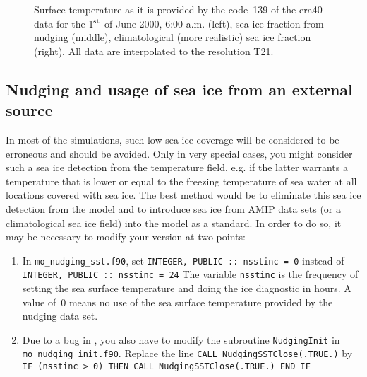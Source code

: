 \begin{appendix}
\begin{figure}[h]
         {\hspace{-3cm}}
         {\hspace{-3cm}}
\caption{Surface temperature as it is provided by the code~139 of the
  era40 data for the 1$^{\rm st}$ of June 2000, 6:00 a.m. (left), sea
  ice fraction from nudging (middle), climatological (more realistic)
  sea ice fraction (right). All data are interpolated to the
  resolution T21.}\label{figice} 
\end{figure}

\subsection{Nudging and usage of sea ice from an external source}

In most of the simulations, such low sea ice coverage will be
considered to be erroneous and should be avoided. Only in very special
cases, you might consider such a sea ice detection from the
temperature field, e.g. if the latter warrants a
temperature that is lower or equal to the freezing temperature of sea
water at all locations covered with sea ice. The best method would be
to eliminate 
this sea ice detection from the model and to introduce sea ice from
AMIP data sets (or a climatological sea ice field) into the model as a
standard. In order to do so, it may be necessary to modify your \echamf{} version
at two points:

\begin{enumerate}
\item In {\tt mo\_nudging\_sst.f90}, set \newline
{\tt INTEGER, PUBLIC :: nsstinc = 0}\newline
instead of \newline
{\tt INTEGER, PUBLIC :: nsstinc = 24}\newline
The variable {\tt nsstinc} is the frequency of setting the
sea surface temperature and doing the ice diagnostic in hours. A value
of~0 means no use of the sea surface temperature provided by the nudging data
set.
\item Due to a bug in \echamf, you also have to modify the subroutine
  {\tt  NudgingInit} in {\tt mo\_nudging\_init.f90}. Replace the
  line\newline
  {\tt  CALL NudgingSSTClose(.TRUE.)}\newline
  by\newline
  {\tt IF (nsstinc > 0) THEN \newline
         CALL NudgingSSTClose(.TRUE.)\newline
      END IF}\newline
\end{enumerate}


\end{appendix}
